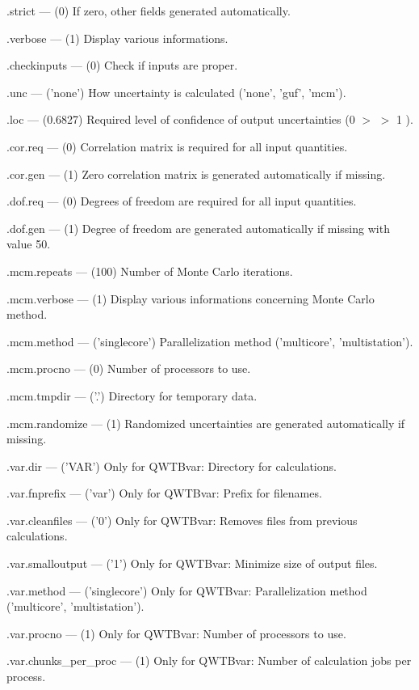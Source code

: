 \documentclass[12pt,a4paper,oneside]{report} %
\begin{document}
\begin{tightdesc}
        \item [\textsf{.strict}] ---  (0) If zero, other fields generated automatically.
        \item [\textsf{.verbose}] ---  (1) Display various informations.
        \item [\textsf{.checkinputs}] ---  (0) Check if inputs are proper.
        \item [\textsf{.unc}] ---  ('none') How uncertainty is calculated ('none', 'guf', 'mcm').
        \item [\textsf{.loc}] ---  (0.6827) Required level of confidence of output uncertainties (0 $>$  $>$ 1 ).
        \item [\textsf{.cor.req}] ---  (0) Correlation matrix is required for all input quantities.
        \item [\textsf{.cor.gen}] ---  (1) Zero correlation matrix is generated automatically if missing.
        \item [\textsf{.dof.req}] ---  (0) Degrees of freedom are required for all input quantities.
        \item [\textsf{.dof.gen}] ---  (1) Degree of freedom are generated automatically if missing with value 50.
        \item [\textsf{.mcm.repeats}] ---  (100) Number of Monte Carlo iterations.
        \item [\textsf{.mcm.verbose}] ---  (1) Display various informations concerning Monte Carlo method.
        \item [\textsf{.mcm.method}] ---  ('singlecore') Parallelization method ('multicore', 'multistation').
        \item [\textsf{.mcm.procno}] ---  (0) Number of processors to use.
        \item [\textsf{.mcm.tmpdir}] ---  ('.') Directory for temporary data.
        \item [\textsf{.mcm.randomize}] ---  (1) Randomized uncertainties are generated automatically if missing.
        \item [\textsf{.var.dir}] ---  ('VAR') Only for QWTBvar: Directory for calculations.
        \item [\textsf{.var.fnprefix}] ---  ('var') Only for QWTBvar: Prefix for filenames.
        \item [\textsf{.var.cleanfiles}] ---  ('0') Only for QWTBvar: Removes files from previous calculations.
        \item [\textsf{.var.smalloutput}] ---  ('1') Only for QWTBvar: Minimize size of output files.
        \item [\textsf{.var.method}] ---  ('singlecore') Only for QWTBvar: Parallelization method ('multicore', 'multistation').
        \item [\textsf{.var.procno}] ---  (1) Only for QWTBvar: Number of processors to use.
        \item [\textsf{.var.chunks\_per\_proc}] --- (1) Only for QWTBvar: Number of calculation jobs per process.
\end{tightdesc}
\end{document}

